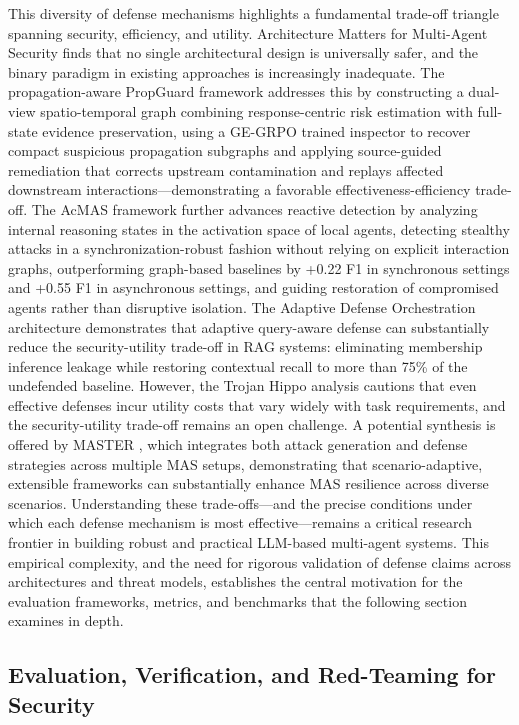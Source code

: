 \documentclass[11pt]{article}
\begin{document}
This diversity of defense mechanisms highlights a fundamental trade-off triangle spanning security, efficiency, and utility. Architecture Matters for Multi-Agent Security finds that no single architectural design is universally safer, and the binary paradigm in existing approaches is increasingly inadequate. The propagation-aware PropGuard framework \cite{ref441} addresses this by constructing a dual-view spatio-temporal graph combining response-centric risk estimation with full-state evidence preservation, using a GE-GRPO trained inspector to recover compact suspicious propagation subgraphs and applying source-guided remediation that corrects upstream contamination and replays affected downstream interactions---demonstrating a favorable effectiveness-efficiency trade-off. The AcMAS framework \cite{ref442} further advances reactive detection by analyzing internal reasoning states in the activation space of local agents, detecting stealthy attacks in a synchronization-robust fashion without relying on explicit interaction graphs, outperforming graph-based baselines by +0.22 F1 in synchronous settings and +0.55 F1 in asynchronous settings, and guiding restoration of compromised agents rather than disruptive isolation. The Adaptive Defense Orchestration architecture \cite{ref443} demonstrates that adaptive query-aware defense can substantially reduce the security-utility trade-off in RAG systems: eliminating membership inference leakage while restoring contextual recall to more than 75\% of the undefended baseline. However, the Trojan Hippo analysis \cite{ref413} cautions that even effective defenses incur utility costs that vary widely with task requirements, and the security-utility trade-off remains an open challenge. A potential synthesis is offered by MASTER \cite{ref444}, which integrates both attack generation and defense strategies across multiple MAS setups, demonstrating that scenario-adaptive, extensible frameworks can substantially enhance MAS resilience across diverse scenarios. Understanding these trade-offs---and the precise conditions under which each defense mechanism is most effective---remains a critical research frontier in building robust and practical LLM-based multi-agent systems. This empirical complexity, and the need for rigorous validation of defense claims across architectures and threat models, establishes the central motivation for the evaluation frameworks, metrics, and benchmarks that the following section examines in depth.

\subsection{Evaluation, Verification, and Red-Teaming for Security}
\end{document}
